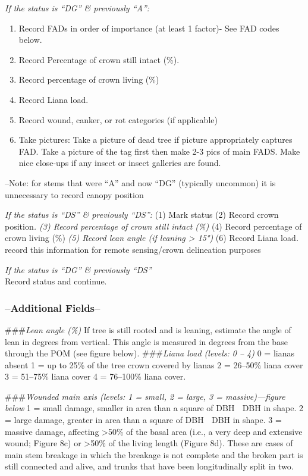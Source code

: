 \documentclass[
]{article}
\providecommand{\tightlist}{%
  \setlength{\itemsep}{0pt}\setlength{\parskip}{0pt}}
\begin{document}
\emph{If the status is ``DG'' \& previously ``A'':}

\begin{enumerate}
\def\labelenumi{(\arabic{enumi})}
\tightlist
\item
  Record FADs in order of importance (at least 1 factor)- See FAD codes
  below.
\item
  Record Percentage of crown still intact (\%).
\item
  Record percentage of crown living (\%)
\item
  Record Liana load.
\item
  Record wound, canker, or rot categories (if applicable)
\item
  Take pictures: Take a picture of dead tree if picture appropriately
  captures FAD. Take a picture of the tag first then make 2-3 pics of
  main FADS. Make nice close-ups if any insect or insect galleries are
  found.
\end{enumerate}

--Note: for stems that were ``A'' and now ``DG'' (typically uncommon) it
is unnecessary to record canopy position

\emph{If the status is ``DS'' \& previously ``DS'':} (1) Mark status (2)
Record crown position\emph{. (3) Record percentage of crown still intact
(\%)} (4) Record percentage of crown living (\%)\emph{ (5) Record lean
angle (if leaning \textgreater{} 15°)} (6) Record Liana load\emph{.
}record this information for remote sensing/crown delineation purposes

\emph{If the status is ``DG'' \& previously ``DS''}\\
Record status and continue.

\hypertarget{additional-fields}{%
\subsubsection{--Additional Fields--}\label{additional-fields}}

\#\#\#\emph{Lean angle (\%)} If tree is still rooted and is leaning,
estimate the angle of lean in degrees from vertical. This angle is
measured in degrees from the base through the POM (see figure below).
\#\#\#\emph{Liana load (levels: 0 -- 4)} 0 = lianas absent 1 = up to
25\% of the tree crown covered by lianas 2 = 26--50\% liana cover 3 =
51--75\% liana cover 4 = 76--100\% liana cover.

\#\#\#\emph{Wounded main axis (levels: 1 = small, 2 = large, 3 =
massive)---figure below} 1 = small damage, smaller in area than a square
of DBH  DBH in shape. 2 = large damage, greater in area than a square
of DBH  DBH in shape. 3 = massive damage, affecting \textgreater50\% of
the basal area (i.e., a very deep and extensive wound; Figure 8c) or
\textgreater50\% of the living length (Figure 8d). These are cases of
main stem breakage in which the breakage is not complete and the broken
part is still connected and alive, and trunks that have been
longitudinally split in two.
\end{document}
